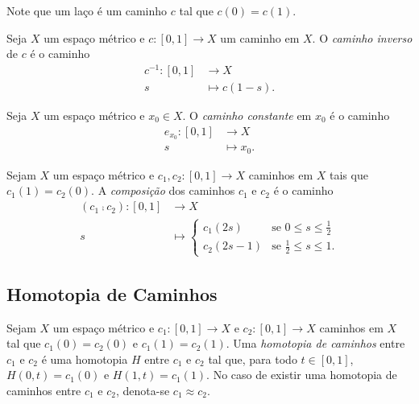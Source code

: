 Note que um laço é um caminho $c$ tal que $c(0)=c(1)$.

\begin{defi}
	Seja $X$ um espaço métrico e $c: [0,1] \to X$ um caminho em $X$. O \emph{caminho inverso} de $c$ é o caminho
	\begin{align*}
	c^{-1}: [0,1] &\to X \\
				s &\mapsto c(1-s).
	\end{align*}
\end{defi}

\begin{defi}
	Seja $X$ um espaço métrico e $x_0 \in X$. O \emph{caminho constante} em $x_0$ é o caminho
	\begin{align*}
	e_{x_0}: [0,1] &\to X \\
				s &\mapsto x_0.
	\end{align*}
\end{defi}

\begin{defi}
	Sejam $X$ um espaço métrico e $c_1,c_2: [0,1] \to X$ caminhos em $X$ tais que $c_1(1)=c_2(0)$. A \emph{composição} dos caminhos $c_1$ e $c_2$ é o caminho
	\begin{align*}
	(c_1 \comp c_2): [0,1] &\to X \\
		s &\mapsto \begin{cases}
					c_1(2s) &\text{se $0 \leq s \leq \frac{1}{2}$} \\
					c_2(2s-1) &\text{se $\frac{1}{2} \leq s \leq 1$}.
					\end{cases}
	\end{align*}
\end{defi}


\subsection{Homotopia de Caminhos}

\begin{defi}
	Sejam $X$ um espaço métrico e $c_1: [0,1] \to X$ e $c_2: [0,1] \to X$ caminhos em $X$ tal que $c_1(0)=c_2(0)$ e $c_1(1)=c_2(1)$. Uma \emph{homotopia de caminhos} entre $c_1$ e $c_2$ é uma homotopia $H$ entre $c_1$ e $c_2$ tal que, para todo $t \in [0,1]$, $H(0,t)=c_1(0)$ e $H(1,t)=c_1(1)$. No caso de existir uma homotopia de caminhos entre $c_1$ e $c_2$, denota-se $c_1 \approx c_2$.
\end{defi}

